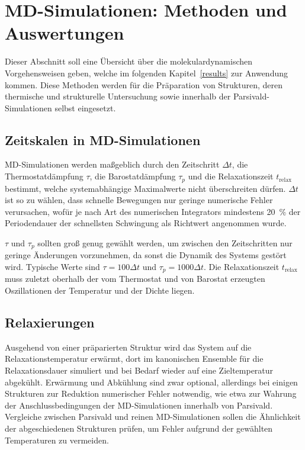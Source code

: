 \section{MD-Simulationen: Methoden und Auswertungen}
\label{mdmethods}

Dieser Abschnitt soll eine Übersicht über die molekulardynamischen Vorgehensweisen geben, welche im folgenden Kapitel~\ref{results} zur Anwendung kommen.
Diese Methoden werden für die Präparation von Strukturen, deren thermische und strukturelle Untersuchung sowie innerhalb der Parsivald-Simulationen selbst eingesetzt.

\subsection{Zeitskalen in MD-Simulationen}

MD-Simulationen werden maßgeblich durch den Zeitschritt $\Delta t$, die Thermostatdämpfung $\tau$, die Barostatdämpfung $\tau_p$ und die Relaxationszeit $t_\text{relax}$ bestimmt, welche systemabhängige Maximalwerte nicht überschreiten dürfen.
$\Delta t$ ist so zu wählen, dass schnelle Bewegungen nur geringe numerische Fehler verursachen, wofür je nach Art des numerischen Integrators mindestens \SI{20}{\percent} der Periodendauer der schnellsten Schwingung als Richtwert angenommen wurde.

$\tau$ und $\tau_p$ sollten groß genug gewählt werden, um zwischen den Zeitschritten nur geringe Änderungen vorzunehmen, da sonst die Dynamik des Systems gestört wird.
Typische Werte sind $\tau = 100 \Delta t$ und $\tau_p = 1000 \Delta t$.
Die Relaxationszeit $t_\text{relax}$ muss zuletzt oberhalb der vom Thermostat und von Barostat erzeugten Oszillationen der Temperatur und der Dichte liegen.

\subsection{Relaxierungen}

Ausgehend von einer präparierten Struktur wird das System auf die Relaxationstemperatur erwärmt, dort im kanonischen Ensemble für die Relaxationsdauer simuliert und bei Bedarf wieder auf eine Zieltemperatur abgekühlt.
Erwärmung und Abkühlung sind zwar optional, allerdings bei einigen Strukturen zur Reduktion numerischer Fehler notwendig, wie etwa zur Wahrung der Anschlussbedingungen der MD-Simulationen innerhalb von Parsivald.
Vergleiche zwischen Parsivald und reinen MD-Simulationen sollen die Ähnlichkeit der abgeschiedenen Strukturen prüfen, um Fehler aufgrund der gewählten Temperaturen zu vermeiden.

